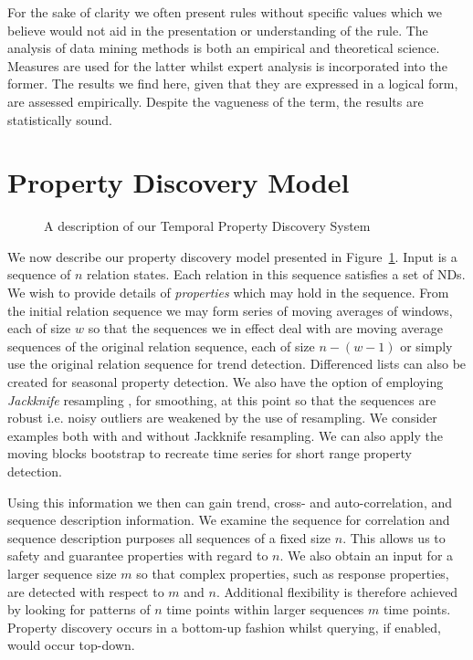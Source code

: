 \medskip

For the sake of clarity we often present rules without specific values
which we believe would not aid in the presentation or understanding of
the rule. The analysis of data mining methods is both an empirical and
theoretical science. Measures are used for the latter whilst expert
analysis is incorporated into the former. The results we find here,
given that they are expressed in a logical form, are assessed
empirically. Despite the vagueness of the term, the results are statistically
sound. 

\section{Property Discovery Model}\label{sec:tr_propmodel}


\begin{figure}[ht]
\centerline{}
\caption{\label{fig:model2} A description of our Temporal Property
Discovery System}
\end{figure}


We now describe our property discovery model presented in
Figure~\ref{fig:model2}. Input is a sequence of $n$ relation states.
Each relation in this sequence
satisfies a set of NDs. We wish to provide details of {\em properties}
which may hold in the sequence. From the initial relation sequence we
may form series of moving averages of windows, each of size $w$ so that
the sequences we in effect deal with are
moving average sequences of the original relation sequence, each of
size $n - (w-1)$ or simply use the original relation sequence for
trend detection. Differenced lists can also be created for seasonal
property detection. 
We also have the option of employing {\em Jackknife}
resampling \cite{efr82}, for smoothing, at this point so that the sequences are robust i.e. noisy
outliers are weakened by the use of resampling.  We consider examples both with
and without Jackknife resampling. We can also apply the moving blocks
bootstrap to recreate time series for short range property detection.
\medskip


Using
this information we then can gain trend, cross- and auto-correlation,
and sequence description information. We examine the sequence for correlation
and sequence description purposes all sequences of a fixed size
$n$. This allows us to safety and guarantee properties with
regard to $n$.  We also obtain an input for a larger sequence size 
$m$ so
that complex properties, such as response properties, are detected
with respect to $m$ and $n$. Additional flexibility
is therefore achieved by looking for patterns of $n$  time points
within larger sequences $m$ time points. Property discovery occurs in
a bottom-up fashion whilst querying, if enabled, would occur top-down.

